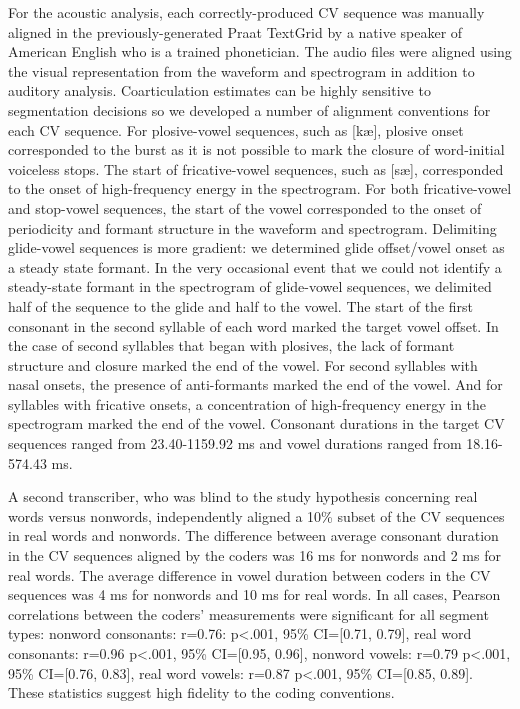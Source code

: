 \documentclass[a4paper,man,natbib,donotrepeattitle, apacite]{apa6}
\begin{document}
For the acoustic analysis, each correctly-produced CV sequence was manually aligned in the previously-generated Praat TextGrid \cite{boersmaPraatDoingPhonetics2018} by a native speaker of American English who is a trained phonetician. The audio files were aligned using the visual representation from the waveform and spectrogram in addition to auditory analysis. Coarticulation estimates can be highly sensitive to segmentation decisions so we developed a number of alignment conventions for each CV sequence. For plosive-vowel sequences, such as [k\ae], plosive onset corresponded to the burst as it is not possible to mark the closure of word-initial voiceless stops. The start of fricative-vowel sequences, such as [s\ae], corresponded to the onset of high-frequency energy in the spectrogram. For both fricative-vowel and stop-vowel sequences, the start of the vowel corresponded to the onset of periodicity and formant structure in the waveform and spectrogram. Delimiting glide-vowel sequences is more gradient: we determined glide offset/vowel onset as a steady state formant. In the very occasional event that we could not identify a steady-state formant in the spectrogram of glide-vowel sequences, we delimited half of the sequence to the glide and half to the vowel. The start of the first consonant in the second syllable of each word marked the target vowel offset. In the case of second syllables that began with plosives, the lack of formant structure and closure marked the end of the vowel. For second syllables with nasal onsets, the presence of anti-formants marked the end of the vowel. And for syllables with fricative onsets, a concentration of high-frequency energy in the spectrogram marked the end of the vowel. Consonant durations in the target CV sequences ranged from 23.40-1159.92 ms and vowel durations ranged from 18.16-574.43 ms.  

A second transcriber, who was blind to the study hypothesis concerning real words versus nonwords, independently aligned a 10\% subset of the CV sequences in real words and nonwords. The difference between average consonant duration in the CV sequences aligned by the coders was 16 ms for nonwords and 2 ms for real words. The average difference in vowel duration between coders in the CV sequences was 4 ms for nonwords and 10 ms for real words. In all cases, Pearson correlations between the coders’ measurements were significant for all segment types: nonword consonants: r=0.76: p<.001, 95\% CI=[0.71, 0.79], real word consonants: r=0.96 p<.001, 95\% CI=[0.95, 0.96], nonword vowels: r=0.79 p<.001, 95\% CI=[0.76, 0.83], real word vowels: r=0.87 p<.001, 95\% CI=[0.85, 0.89]. These statistics suggest high fidelity to the coding conventions. 
\end{document}
